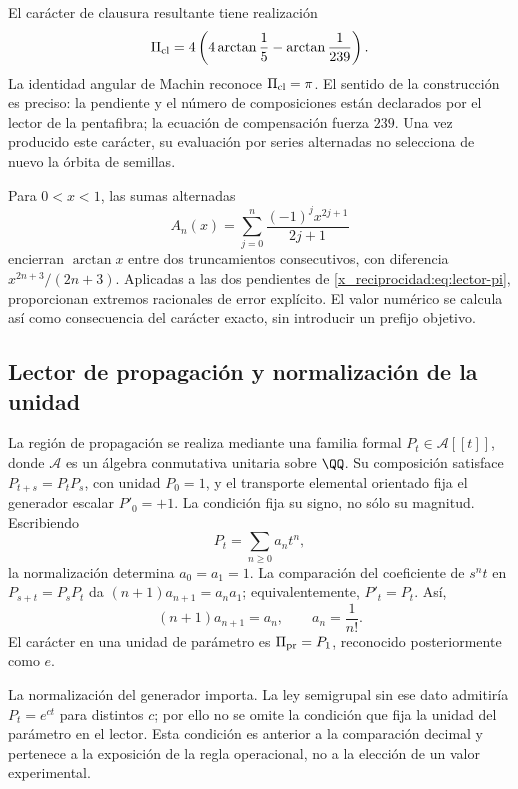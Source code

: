 El carácter de clausura resultante tiene realización
\begin{equation}
 \Pi_{\rm cl}=4\left(4\arctan\frac15-\arctan\frac1{239}\right).
 \label{x_reciprocidad:eq:lector-pi}
\end{equation}
La identidad angular de Machin reconoce \(\Pi_{\rm cl}=\pi\). El sentido de la construcción es preciso: la pendiente y el número de composiciones están declarados por el lector de la pentafibra; la ecuación de compensación fuerza \(239\). Una vez producido este carácter, su evaluación por series alternadas no selecciona de nuevo la órbita de semillas.

Para \(0<x<1\), las sumas alternadas
\[
 A_n(x)=\sum_{j=0}^n\frac{(-1)^jx^{2j+1}}{2j+1}
\]
encierran \(\arctan x\) entre dos truncamientos consecutivos, con diferencia \(x^{2n+3}/(2n+3)\). Aplicadas a las dos pendientes de \eqref{x_reciprocidad:eq:lector-pi}, proporcionan extremos racionales de error explícito. El valor numérico se calcula así como consecuencia del carácter exacto, sin introducir un prefijo objetivo.

\subsection{Lector de propagación y normalización de la unidad}

La región de propagación se realiza mediante una familia formal \(P_t\in\mathcal A[[t]]\), donde \(\mathcal A\) es un álgebra conmutativa unitaria sobre \(\QQ\). Su composición satisface \(P_{t+s}=P_tP_s\), con unidad \(P_0=1\), y el transporte elemental orientado fija el generador escalar \(P'_0=+1\). La condición fija su signo, no sólo su magnitud. Escribiendo
\[
 P_t=\sum_{n\ge0}a_nt^n,
\]
la normalización determina \(a_0=a_1=1\). La comparación del coeficiente de \(s^nt\) en \(P_{s+t}=P_sP_t\) da \((n+1)a_{n+1}=a_na_1\); equivalentemente, \(P'_t=P_t\). Así,
\begin{equation}
 (n+1)a_{n+1}=a_n,\qquad a_n=\frac1{n!}.
 \label{x_reciprocidad:eq:propagacion}
\end{equation}
El carácter en una unidad de parámetro es \(\Pi_{\rm pr}=P_1\), reconocido posteriormente como \(e\).

La normalización del generador importa. La ley semigrupal sin ese dato admitiría \(P_t=e^{ct}\) para distintos \(c\); por ello no se omite la condición que fija la unidad del parámetro en el lector. Esta condición es anterior a la comparación decimal y pertenece a la exposición de la regla operacional, no a la elección de un valor experimental.

